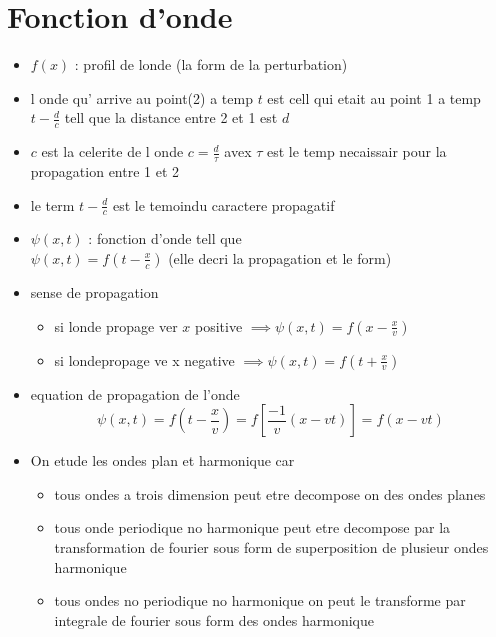 \documentclass[12pt]{book}
\begin{document}
        \section{Fonction d'onde}
            \begin{itemize}
                \item $f(x)$ : profil de londe (la form de la perturbation) 
                \item l onde qu' arrive au point(2) a temp $t$ est cell qui etait au point 1 a temp $ t- \frac{d}{c}$ tell que la distance entre 2 et 1 est $ d $
                \item $c$ est la celerite de l onde $ c= \frac{d}{\tau} $ avex $\tau $ est le temp necaissair pour la propagation entre 1 et 2 
                \item le term $ t - \frac{d}{c} $ est le temoindu caractere propagatif
                \item $\psi(x,t) $ : fonction d'onde tell que \\
                    $\psi(x,t) = f(t- \frac{x}{c}) $ (elle decri la propagation et le form)
                \item sense de propagation 
                    \begin{itemize}
                        \item si londe propage ver $x$ positive $\implies \psi(x,t) = f(x-\frac{x}{v})$
                        \item si londepropage ve x negative $\implies \psi(x,t) = f(t+ \frac{x}{v})$
                    \end{itemize}
                \item equation de propagation de l'onde \[\psi(x,t) = f(t-\frac{x}{v})=f[\frac{-1}{v}(x-vt)]=f(x-vt)\]
                \item On etude les ondes plan et harmonique car 
                    \begin{itemize}
                        \item tous ondes a trois dimension peut etre decompose on des ondes planes
                        \item tous onde periodique no harmonique peut etre decompose par la transformation de fourier sous form de superposition de plusieur ondes harmonique
                        \item tous ondes no periodique no harmonique on peut le transforme par integrale de fourier sous form des ondes harmonique
                    \end{itemize}
            \end{itemize}
\end{document}
